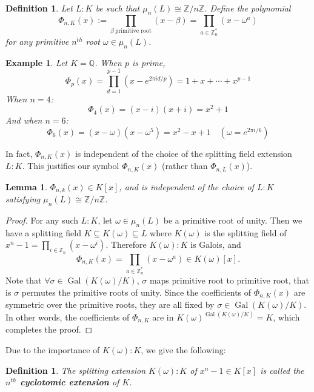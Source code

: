 \documentclass[11pt]{book}
\newtheorem{definition}[theorem]{Definition}
\newtheorem{example}[theorem]{Example}
\newtheorem{lemma}[theorem]{Lemma}
\begin{document}
\begin{definition}
    Let $L:K$ be such that $\mu_n(L) \cong \mathbb{Z}/n \mathbb{Z}$. Define the polynomial
    $$\Phi_{n,K}(x) := \prod_{\beta\ \text{primitive root}}(x-\beta) = \prod_{a \in \mathbb{Z}_n^*}(x-\omega^a)$$
for any primitive $n^{th}$ root $\omega \in \mu_n(L)$.
\end{definition}
\begin{example}
Let $K = \mathbb{Q}$. When $ p $ is prime,
$$
\Phi_p(x) = \prod_{d=1}^{p-1} \left(x - e^{2\pi i d/p}\right) = 1 + x + \cdots + x^{p-1}
$$
When $ n = 4 $:
$$
\Phi_4(x) = (x - i)(x + i) = x^2 + 1 
$$
And when $ n = 6 $:
$$
\Phi_6(x) = (x - \omega)(x - \omega^5) = x^2 - x + 1 \quad (\omega = e^{2\pi i/6})
$$
\end{example}
In fact, $\Phi_{n,K}(x)$ is independent of the choice of the splitting field extension $L:K$. This justifies our symbol $\Phi_{n,K}(x)$ (rather than $\Phi_{n,L}(x)$).
\begin{lemma}
    $\Phi_{n,k}(x)\in K[x] $, and is independent of the choice of $L:K$ satisfying $\mu_n(L) \cong \mathbb{Z}/n\mathbb{Z}$.
\end{lemma}
\begin{proof}
    For any such $L:K$, let $\omega \in \mu_n(L)$ be a primitive root of unity. Then we have a splitting field $K\subseteq K(\omega) \subseteq L$ where $K(\omega)$ is the splitting field of $x^n-1 = \prod_{i \in \mathbb{Z}_n}(x-\omega^i)$. Therefore $K(\omega):K$ is Galois, and 
    $$\Phi_{n,K}(x) = \prod_{a \in \mathbb{Z}_n^*}(x-\omega^a) \in K(\omega)[x].$$ 
    Note that $\forall \sigma \in \operatorname{Gal}(K(\omega)/K)$, $\sigma$ maps primitive root to primitive root, that is $\sigma$ permutes the primitive roots of unity. 
    Since the coefficients of $\Phi_{n,K}(x)$ are symmetric over the primitive roots, they are all fixed by $\sigma \in \operatorname{Gal}(K(\omega)/K)$. In other words, the coefficients of $\Phi_{n,K}$ are 
    in $K(\omega)^{\operatorname{Gal}(K(\omega)/K)}=K$, which completes the proof.
\end{proof}

Due to the importance of $K(\omega):K$, we give the following:
\begin{definition}
The splitting extension $K(\omega):K$ of $x^n-1 \in K[x]$ is called the {\bf $n^{th}$ cyclotomic extension} of $K$.   
\end{definition}
\end{document}
